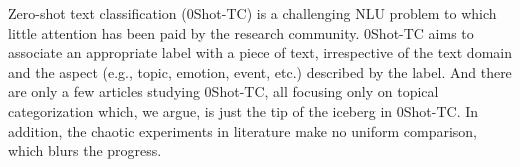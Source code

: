 Zero-shot text classification (0Shot-TC) is a challenging NLU problem to which little attention has been paid by the research community. 0Shot-TC aims to  associate an appropriate label with a piece of text,  irrespective of the text domain and the aspect (e.g., topic, emotion, event,  etc.) described by the label. And there are only a few articles studying 0Shot-TC, all focusing only on topical categorization which, we argue, is just the tip of the iceberg in 0Shot-TC. In addition, the chaotic experiments in literature make no uniform comparison, which blurs the progress.